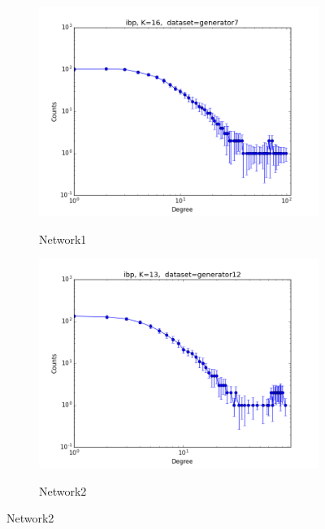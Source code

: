 
\begin{figure}[h]
        \centering
        \begin{subfigure}[b]{0.300\textwidth}
            \centering
            \includegraphics[width=\textwidth]{img/expe/1_ibp/figure_1}
            \label{fig:mean and std of net14}
            \caption {{\small Network1}}    
        \end{subfigure}
        \begin{subfigure}[b]{0.300\textwidth}
            \centering
            \includegraphics[width=\textwidth]{img/expe/2_ibp/figure_1}
            \label{fig:mean and std of net14}
            \caption {{\small Network2}}    
        \end{subfigure}

\end{figure}
